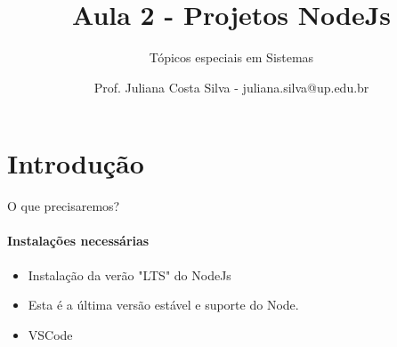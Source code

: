 \documentclass{beamer}
\title{Aula 2  - Projetos NodeJs}
\subtitle{Tópicos especiais em Sistemas}
\author{Prof. Juliana Costa Silva - juliana.silva@up.edu.br}
\begin{document}
  \frame[c]{\maketitle}
    \section{Introdução}
    \begin{frame}{O que precisaremos?}
      \framesubtitle{Instalações necessárias}%
      
      \begin{itemize}
            \item Instalação da verão "LTS" do NodeJs
            \item Esta é a última versão estável e suporte do Node.
            \item VSCode
       \end{itemize}
     \end{frame}

\end{document}
